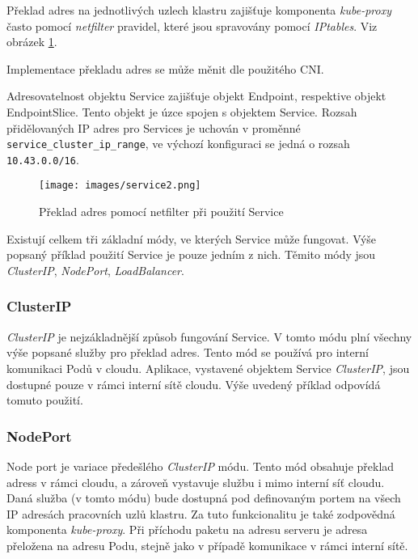 Překlad adres na jednotlivých uzlech klastru zajišťuje komponenta \textit{kube-proxy} často pomocí \textit{netfilter} pravidel, které jsou spravovány pomocí \textit{IPtables}. Viz obrázek \ref{fig:service2}.

Implementace překladu adres se může měnit dle použitého CNI.

Adresovatelnost objektu Service zajišťuje objekt Endpoint, respektive objekt EndpointSlice. Tento objekt je úzce spojen s objektem Service. Rozsah přidělovaných IP adres pro Services je uchován v proměnné \verb|service_cluster_ip_range|, ve výchozí konfiguraci se jedná o rozsah \verb|10.43.0.0/16|. \cite{suserancher_2023_rancher}

\begin{figure}[!ht]
    \centering
    \texttt{[image: images/service2.png]}
    \caption[Překlad adres pomocí netfilter při použití Service]{Překlad adres pomocí netfilter při použití Service\cite{betz_2017_netfilter}}
    \label{fig:service2}
\end{figure}


Existují celkem tři základní módy, ve kterých Service může fungovat. Výše popsaný příklad použití Service je pouze jedním z nich. Těmito módy jsou \textit{ClusterIP}, \textit{NodePort}, 
\textit{LoadBalancer}. \cite{poulton_2022_the}%

\subsubsection{ClusterIP}
\textit{ClusterIP} je nejzákladnější způsob fungování Service. V tomto módu plní všechny výše popsané služby pro překlad adres. Tento mód se používá pro interní komunikaci Podů v cloudu. Aplikace, vystavené objektem Service \textit{ClusterIP}, jsou dostupné pouze v rámci interní sítě cloudu. \cite{thekubernetesauthors_2023_service} Výše uvedený příklad odpovídá tomuto použití.

\subsubsection{NodePort}
Node port je variace předešlého \textit{ClusterIP} módu. Tento mód obsahuje překlad adress v rámci cloudu, a zároveň vystavuje službu i mimo interní síť cloudu. Daná služba (v tomto módu) bude dostupná pod definovaným portem na všech IP adresách pracovních uzlů klastru. Za tuto funkcionalitu je také zodpovědná komponenta \textit{kube-proxy}. Při příchodu paketu na adresu serveru je adresa přeložena na adresu Podu, stejně jako v případě komunikace v rámci interní sítě. \cite{thekubernetesauthors_2023_service}   

